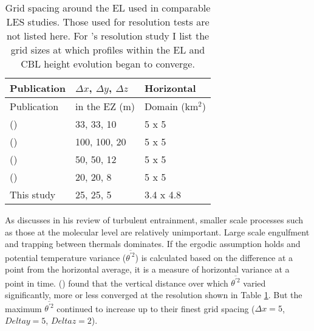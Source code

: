 \begin{table}[htbp]
\caption[]{Grid spacing around the \acs{EL} used in comparable \acs{LES} studies. Those used for resolution tests are not listed here.  For \citeauthor{SullPat}'s \citeyear{SullPat} resolution study I list the grid sizes at which profiles within the \acs{EL} and \acs{CBL} height evolution began to converge.}

    \begin{center}
    \begin{tabular}{ p{5cm} p{3cm} p{3cm}}
Publication & $\Delta x$, $\Delta y$, $\Delta z$ & Horizontal \\ \hline
Publication & in the \acs{EZ} (m)& Domain (km$^{2}$) \\ \hline
      \citeauthor{SullMoengStev} (\citeyear{SullMoengStev}) & 33, 33, 10 & 5 x 5 \\ %
      \citeauthor{FedConzMir04} (\citeyear{FedConzMir04}) & 100, 100, 20 & 5 x 5 \\ [.3cm] %
      \citeauthor{BrooksFowler2} (\citeyear{BrooksFowler2}) & 50, 50, 12 & 5 x 5 \\%
      \citeauthor{SullPat} (\citeyear{SullPat}) &  20, 20, 8 & 5 x 5\\ %
      This study & 25, 25, 5 &  3.4 x 4.8\\ \hline       
    \end{tabular}
\label{table:gridcomp}   
\end{center}    
\end{table}


As \citeauthor{Turner86} discusses in his \citeyear{Turner86} review of turbulent entrainment, smaller scale processes such as those at the molecular level are relatively unimportant.  Large scale engulfment and trapping between thermals dominates.  If the ergodic assumption holds and potential temperature variance ($\overline{\theta^{'2}}$) is calculated based on the difference at a point from the horizontal average, it is a measure of horizontal variance at a point in time.  \citeauthor{SullPat} (\citeyear{SullPat}) found that the vertical distance over which $\overline{\theta^{'2}}$ varied significantly, more or less converged at the resolution shown in Table \ref{table:gridcomp}.  But the maximum $\overline{\theta^{'2}}$ continued to increase up to their finest grid spacing ($\Delta x=5$, $Delta y = 5$, $Delta z = 2$).\\

